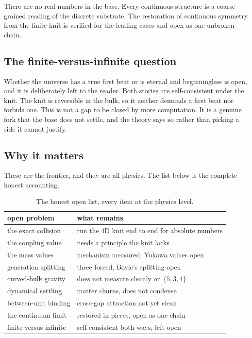 \begin{principle}
There are no real numbers in the base. Every continuous structure is a coarse-grained reading of the discrete substrate. The restoration of continuous symmetry from the finite knit is verified for the leading cases and open as one unbroken chain.
\end{principle}

\subsection{The finite-versus-infinite question}

Whether the universe has a true first beat or is eternal and beginningless is open, and it is deliberately left to the reader. Both stories are self-consistent under the knit. The knit is reversible in the bulk, so it neither demands a first beat nor forbids one. This is not a gap to be closed by more computation. It is a genuine fork that the base does not settle, and the theory says so rather than picking a side it cannot justify.

\subsection{Why it matters}

These are the frontier, and they are all physics. The list below is the complete honest accounting.

\begin{table}[ht]
\centering
\begin{tabular}{@{}ll@{}}
\toprule
open problem & what remains \\
\midrule
the exact collision & run the 4D knit end to end for absolute numbers \\
the coupling value & needs a principle the knit lacks \\
the mass values & mechanism measured, Yukawa values open \\
generation splitting & three forced, Boyle's splitting open \\
curved-bulk gravity & does not measure cleanly on $\{5,3,4\}$ \\
dynamical settling & matter churns, does not condense \\
between-unit binding & cross-gap attraction not yet clean \\
the continuum limit & restored in pieces, open as one chain \\
finite versus infinite & self-consistent both ways, left open \\
\bottomrule
\end{tabular}
\caption{The honest open list, every item at the physics level.}
\label{tab:open-problems}
\end{table}

